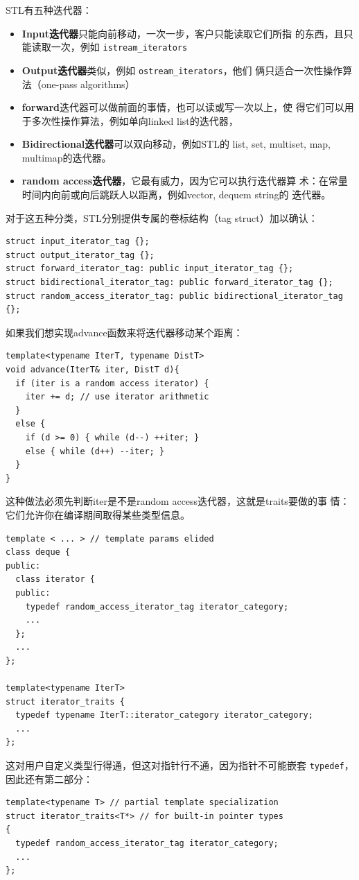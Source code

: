 \documentclass[a4paper,twoside]{article}
\theoremstyle{definition}
\theoremstyle{remark}
\numberwithin{equation}{section}
\let\OldTexttt\texttt
\renewcommand{\texttt}[1]{{\color{blue} \OldTexttt{#1}}}
\begin{document}
STL有五种迭代器：
\begin{itemize}
\item \textbf{Input迭代器}只能向前移动，一次一步，客户只能读取它们所指
  的东西，且只能读取一次，例如\texttt{istream\_iterators}
\item \textbf{Output迭代器}类似，例如\texttt{ostream\_iterators}，他们
  俩只适合一次性操作算法（one-pass algorithms）
\item \textbf{forward}迭代器可以做前面的事情，也可以读或写一次以上，使
  得它们可以用于多次性操作算法，例如单向linked list的迭代器，
\item \textbf{Bidirectional迭代器}可以双向移动，例如STL的
  list, set, multiset, map, multimap的迭代器。
\item \textbf{random access迭代器}，它最有威力，因为它可以执行迭代器算
  术：在常量时间内向前或向后跳跃人以距离，例如vector, dequem string的
  迭代器。
\end{itemize}
对于这五种分类，STL分别提供专属的卷标结构（tag struct）加以确认：
\begin{verbatim}
struct input_iterator_tag {};
struct output_iterator_tag {};
struct forward_iterator_tag: public input_iterator_tag {};
struct bidirectional_iterator_tag: public forward_iterator_tag {};
struct random_access_iterator_tag: public bidirectional_iterator_tag {};
\end{verbatim}

如果我们想实现advance函数来将迭代器移动某个距离：
\begin{verbatim}
template<typename IterT, typename DistT>
void advance(IterT& iter, DistT d){
  if (iter is a random access iterator) {
    iter += d; // use iterator arithmetic
  }
  else {
    if (d >= 0) { while (d--) ++iter; }
    else { while (d++) --iter; }
  }
}
\end{verbatim}
这种做法必须先判断iter是不是random access迭代器，这就是traits要做的事
情：它们允许你在编译期间取得某些类型信息。

\begin{verbatim}
template < ... > // template params elided
class deque {
public:
  class iterator {
  public:
    typedef random_access_iterator_tag iterator_category;
    ...
  };
  ...
};

template<typename IterT>
struct iterator_traits {
  typedef typename IterT::iterator_category iterator_category;
  ...
};
\end{verbatim}
这对用户自定义类型行得通，但这对指针行不通，因为指针不可能嵌套
\texttt{typedef}，因此还有第二部分：
\begin{verbatim}
template<typename T> // partial template specialization
struct iterator_traits<T*> // for built-in pointer types
{
  typedef random_access_iterator_tag iterator_category;
  ...
};
\end{verbatim}
\end{document}
